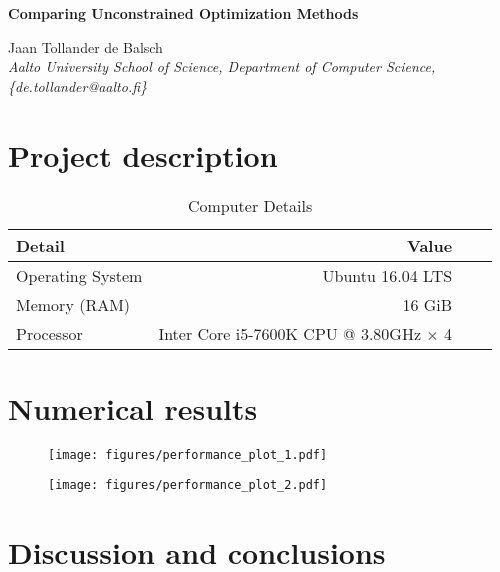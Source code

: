 \documentclass[a4paper]{artikel3}
\begin{document}
\begin{center}
{\Large \onehalfspacing \bf Comparing Unconstrained Optimization Methods}
\end{center}
\vspace{10pt}

\begin{center}
Jaan Tollander de Balsch\\
{\textit{{\small{Aalto University School of Science, Department of Computer Science, 
                \{de.tollander@aalto.fi\}}}}}
\end{center}


\section{Project description}

\begin{table}[H]
\caption{Computer Details}
\label{tbl:1}
\centering
\begin{tabular}{l r r r}
\toprule
Detail & Value\\
\midrule
Operating System & Ubuntu 16.04 LTS \\
Memory (RAM) & 16 GiB \\
Processor & Inter Core i5-7600K CPU @ 3.80GHz $\times$ 4 \\
\bottomrule
\end{tabular}
\end{table}



\section{Numerical results}

\begin{figure}[H]
\texttt{[image: figures/performance\_plot\_1.pdf]}
\end{figure}


\begin{figure}[H]
\texttt{[image: figures/performance\_plot\_2.pdf]}
\end{figure}


\section{Discussion and conclusions}
\end{document}
